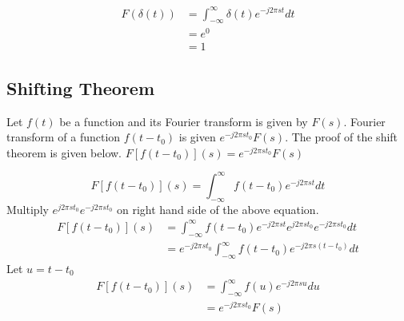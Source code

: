 \begin{equation} \label{eq:delta1}
\begin{split}
F(\delta(t)) & = \int_{-\infty}^{\infty} \delta(t) e^{-j2\pi s t} dt \\
 & = e^0 \\
 & = 1
 \end{split}
\end{equation}

\subsection{Shifting Theorem}
Let $f(t)$ be a function and its Fourier transform is given by $F(s)$. Fourier transform of a function $f(t-t_0)$ is given $e^{-j2\pi s t_0}F(s)$. The proof of the shift theorem is given below. $F[f(t-t_0)](s) = e^{-j 2 \pi s t_0} F(s)$

\begin{equation} 
F[f(t-t_0)](s) = \int_{-\infty}^{\infty} f(t-t_0)  e^{-j2\pi s t} dt 
\end{equation}
Multiply $e^{j2\pi s t_0} e^{-j2\pi s t_0} $ on right hand side of the above equation.
\begin{equation} 
\begin{split}
F[f(t-t_0)](s) &= \int_{-\infty}^{\infty} f(t-t_0) e^{-j2\pi s t} e^{j2\pi s t_0}  e^{-j2\pi s t_0} dt \\
& = e^{-j2\pi s t_0}  \int_{-\infty}^{\infty} f(t-t_0) e^{-j2\pi s (t-t_0)} dt 
 \end{split}
\end{equation}
Let $u = t-t_0$
\begin{equation} 
\begin{split}
F[f(t-t_0)](s) &= \int_{-\infty}^{\infty} f(u) e^{-j2\pi s u} du \\
& = e^{-j2\pi s t_0}  F(s)
 \end{split}
\end{equation}

